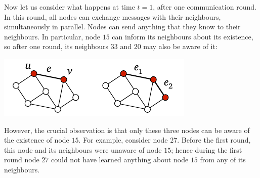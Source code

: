 Now let us consider what happens at time {\boldmath $t = 1$}, after one communication round. In this round, all nodes can exchange messages with their neighbours, simultaneously in parallel. Nodes can send anything that they know to their neighbours. In particular, node $15$ can inform its neighbours about its existence, so after one round, its neighbours $33$ and $20$ may also be aware of it:
\begin{center}
    \includegraphics[page=\PIntroTB]{figs.pdf}
\end{center}
However, the crucial observation is that only these three nodes can be aware of the existence of node $15$. For example, consider node $27$. Before the first round, this node and its neighbours were unaware of node $15$; hence during the first round node $27$ could not have learned anything about node $15$ from any of its neighbours.

